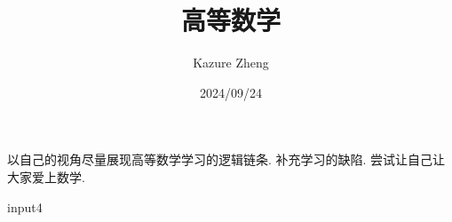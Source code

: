 \documentclass{elegantbook}
\title{高等数学}
\author{Kazure Zheng}
\date{2024/09/24}
\begin{document}
    \maketitle
    以自己的视角尽量展现高等数学学习的逻辑链条. 补充学习的缺陷. 尝试让自己让大家爱上数学. 
    \tableofcontents
    \mainmatter

    
    \newpage

    input{4}
    \newpage
    
\end{document}
